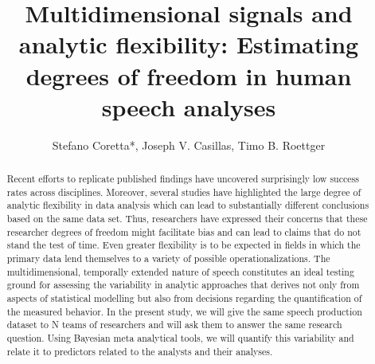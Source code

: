 \documentclass[Review,times,sageh]{sagej}
\begin{document}
\title{Multidimensional signals and analytic flexibility: Estimating degrees of
freedom in human speech analyses}


\author{Stefano Coretta*, Joseph V. Casillas, Timo B. Roettger}




\begin{abstract}
Recent efforts to replicate published findings have uncovered
surprisingly low success rates across disciplines. Moreover, several
studies have highlighted the large degree of analytic flexibility in
data analysis which can lead to substantially different conclusions
based on the same data set. Thus, researchers have expressed their
concerns that these researcher degrees of freedom might facilitate bias
and can lead to claims that do not stand the test of time. Even greater
flexibility is to be expected in fields in which the primary data lend
themselves to a variety of possible operationalizations. The
multidimensional, temporally extended nature of speech constitutes an
ideal testing ground for assessing the variability in analytic
approaches that derives not only from aspects of statistical modelling
but also from decisions regarding the quantification of the measured
behavior. In the present study, we will give the same speech production
dataset to N teams of researchers and will ask them to answer the same
research question. Using Bayesian meta analytical tools, we will
quantify this variability and relate it to predictors related to the
analysts and their analyses.
\end{abstract}


\maketitle
\end{document}
